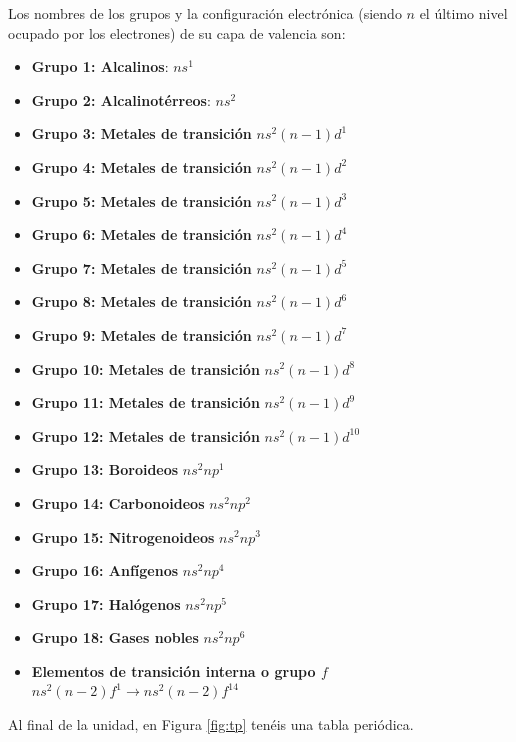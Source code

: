 Los nombres de los grupos y la configuración electrónica (siendo \(n\) el último nivel ocupado por los electrones) de su capa de valencia son:

\begin{itemize}
    \item \textbf{Grupo 1: Alcalinos}: $ns^1$
    \item \textbf{Grupo 2: Alcalinotérreos}: $ns^2$
    \item \textbf{Grupo 3: Metales de transición} $ns^2(n-1)d^1$
    \item \textbf{Grupo 4: Metales de transición} $ns^2(n-1)d^2$
    \item \textbf{Grupo 5: Metales de transición} $ns^2(n-1)d^3$
    \item \textbf{Grupo 6: Metales de transición} $ns^2(n-1)d^4$
    \item \textbf{Grupo 7: Metales de transición} $ns^2(n-1)d^5$
    \item \textbf{Grupo 8: Metales de transición} $ns^2(n-1)d^6$
    \item \textbf{Grupo 9: Metales de transición} $ns^2(n-1)d^7$
    \item \textbf{Grupo 10: Metales de transición} $ns^2(n-1)d^8$
    \item \textbf{Grupo 11: Metales de transición} $ns^2(n-1)d^9$
    \item \textbf{Grupo 12: Metales de transición} $ns^2(n-1)d^{10}$
    \item \textbf{Grupo 13: Boroideos} $ns^2np^1$
    \item \textbf{Grupo 14: Carbonoideos} $ns^2np^2$
    \item \textbf{Grupo 15: Nitrogenoideos} $ns^2np^3$
    \item \textbf{Grupo 16: Anfígenos} $ns^2np^4$
    \item \textbf{Grupo 17: Halógenos} $ns^2np^5$
    \item \textbf{Grupo 18: Gases nobles} $ns^2np^6$
    \item \textbf{Elementos de transición interna o grupo $f$} $ns^2(n-2)f^1 \longrightarrow ns^2(n-2)f^{14}$
\end{itemize}
Al final de la unidad, en Figura \ref{fig:tp} tenéis una tabla periódica.


